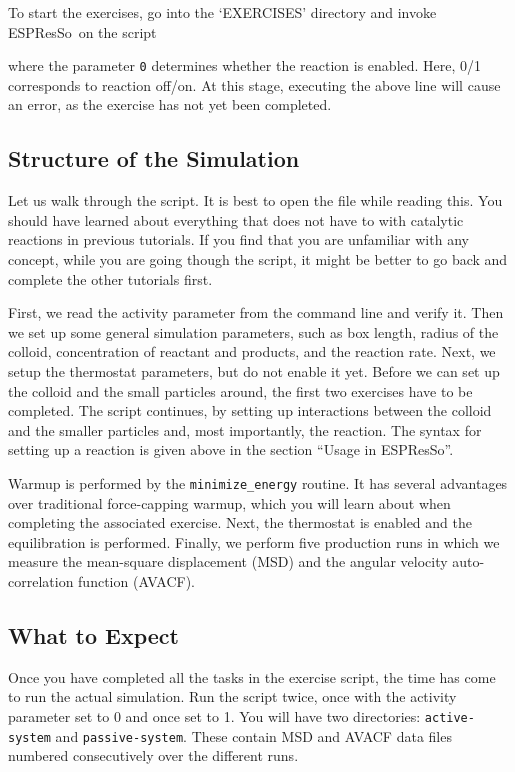 \documentclass[aip,jcp,reprint,a4paper,onecolumn,nofootinbib,amsmath,amssymb]{revtex4-1}
\newcommand\code{\lstinline}
\newcommand{\es}{\mbox{\textsf{ESPResSo}}\xspace}
\newcommand\codees{\lstinline[language=python]}
\begin{document}
To start the exercises, go into the `EXERCISES' directory and invoke \es\ on the script
where the parameter \code{0} determines whether the reaction is enabled. Here, 0/1 corresponds to reaction off/on. At this stage, executing the above line will cause an error, as the exercise has not yet been completed.

\subsection{Structure of the Simulation}

Let us walk through the script. It is best to open the file while reading this. You should have learned about everything that does not have to with catalytic reactions in previous tutorials. If you find that you are unfamiliar with any concept, while you are going though the script, it might be better to go back and complete the other tutorials first.

First, we read the activity parameter from the command line and verify it. Then we set up some general simulation parameters, such as box length, radius of the colloid, concentration of reactant and products, and the reaction rate. Next, we setup the thermostat parameters, but do not enable it yet. Before we can set up the colloid and the small particles around, the first two exercises have to be completed. The script continues, by setting up interactions between the colloid and the smaller particles and, most importantly, the reaction. The syntax for setting up a reaction is given above in the section ``Usage in \es''.

Warmup is performed by the \codees{minimize_energy} routine. It has several advantages over traditional force-capping warmup, which you will learn about when completing the associated exercise. Next, the thermostat is enabled and the equilibration is performed. Finally, we perform five production runs in which we measure the mean-square displacement (MSD) and the angular velocity auto-correlation function (AVACF).

\subsection{What to Expect}

Once you have completed all the tasks in the exercise script, the time has come to run the actual simulation. Run the script twice, once with the activity parameter set to 0 and once set to 1. You will have two directories: \code{active-system} and \code{passive-system}. These contain MSD and AVACF data files numbered consecutively over the different runs.
\end{document}
